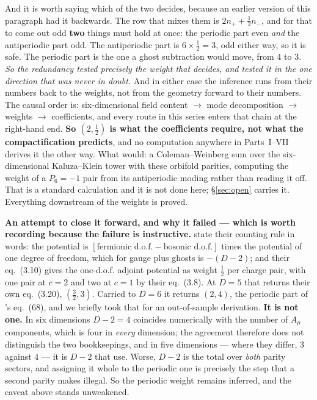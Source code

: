 \documentclass[11pt,a4paper]{article}
\begin{document}
\noindent And it is worth saying which of the two decides, because an earlier version of this
paragraph had it backwards. The row that mixes them is $2n_++\tfrac12 n_-$, and for that to come
out odd \textbf{two} things must hold at once: the periodic part even \emph{and} the antiperiodic
part odd. The antiperiodic part is $6\times\tfrac12=3$, odd either way, so it is safe. The periodic
part is the one a ghost subtraction would move, from $4$ to $3$. \emph{So the redundancy tested
precisely the weight that decides, and tested it in the one direction that was never in doubt.}
And in either case the inference
runs from their numbers back to the weights, not from the geometry forward to their numbers. The causal order is: six-dimensional field content $\to$ mode decomposition $\to$
weights $\to$ coefficients, and every route in this series enters that chain at the right-hand end.
\textbf{So $(2,\tfrac12)$ is what the coefficients require, not what the compactification predicts},
and no computation anywhere in Parts~I--VII derives it the other way. What would: a Coleman--Weinberg
sum over the six-dimensional Kaluza--Klein tower with these orbifold parities, computing the weight
of a $P_6=-1$ pair from its antiperiodic moding rather than reading it off. That is a standard
calculation and it is not done here; \S\ref{sec:open} carries it. Everything downstream of the
weights is proved.

\noindent \textbf{An attempt to close it forward, and why it failed --- which is worth recording
because the failure is instructive.} \cite{HY04} state their counting rule in words: the potential
is $[\text{fermionic d.o.f.}-\text{bosonic d.o.f.}]$ times the potential of one degree of freedom,
which for gauge plus ghosts is $-(D-2)$; and their eq.~(3.10) gives the one-d.o.f. adjoint
potential as weight $\tfrac12$ per charge pair, with one pair at $c=2$ and two at $c=1$ by their
eq.~(3.8). At $D=5$ that returns their own eq.~(3.20), $(\tfrac32,3)$. Carried to $D=6$ it returns
$(2,4)$, the periodic part of \cite{KM25}'s eq.~(68), and we briefly took that for an out-of-sample
derivation. \textbf{It is not one.} In six dimensions $D-2=4$ coincides numerically with the number
of $A_\mu$ components, which is four in \emph{every} dimension; the agreement therefore does not
distinguish the two bookkeepings, and in five dimensions --- where they differ, $3$ against $4$ ---
it is $D-2$ that \cite{HY04} use. Worse, $D-2$ is the total over \emph{both} parity sectors, and
assigning it whole to the periodic one is precisely the step that a second parity makes illegal.
So the periodic weight remains inferred, and the caveat above stands unweakened.
\end{document}
